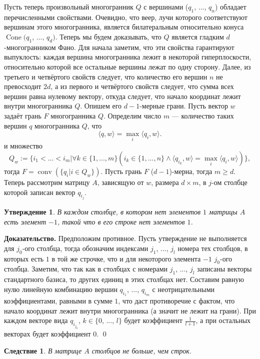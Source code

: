 \documentclass[12pt,notitlepage]{article}
\DeclareMathOperator{\conv}{conv}
\DeclareMathOperator{\Cone}{Cone}
\newtheorem{statement}{Утверждение}
\newtheorem*{corollary}{Следствие}
\begin{document}
	Пусть теперь произвольный многогранник $Q$ с вершинами ($q_1$, ..., $q_n$) обладает перечисленными свойствами. Очевидно, что веер, лучи которого соответствуют вершинам этого многогранника, является билатеральным относительно конуса $\Cone(q_1$, ..., $q_d)$. Теперь мы будем доказывать, что $Q$ является гладким $d$-многогранником Фано. Для начала заметим, что эти свойства гарантируют выпуклость: каждая вершина многогранника лежит в некоторой гиперплоскости, относительно которой все остальные вершины лежат по одну сторону. Далее, из третьего и четвёртого свойств следует, что количество его вершин $n$ не превосходит $2d$, а из первого и четвёртого свойств следует, что сумма всех вершин равна нулевому вектору, откуда следует, что начало координат лежит внутри многогранника $Q$. Опишем его $d-1$-мерные грани. Пусть вектор $w$ задаёт грань $F$ многогранника $Q$. Определим число $m$ --- количество таких вершин $q$ многогранника $Q$, что 
	\[
	\langle q, w\rangle = \max_i  \langle q_i, w\rangle.
	\]
	и множество
	\[
	Q_w := \{ i_1 < ... < i_m | \forall k \in \{1, ..., m\} (i_k \in \{1, ..., n\} \wedge \langle q_{i_k}, w\rangle = \max_i  \langle q_i, w\rangle )\},
	\]
	тогда $F=\conv(\{q_i | i \in Q_w\})$. Пусть грань $F$ ($d-1$)-мерна, тогда $m \geq d$. Теперь рассмотрим матрицу $A$, зависящую от $w$, размера $d \times m$, в $j$-ом столбце которой записан вектор $q_{i_j}$.
	
	\begin{statement}
		В каждом столбце, в котором нет элементов $1$ матрицы $A$ есть элемент $-1$, такой что в его строке нет элементов $1$.
	\end{statement}
	
	\textbf{Доказательство.} Предположим противное. Пусть утверждение не выполняется для $j_0$-ого столбца, тогда обозначим индексами $j_1$, ..., $j_l$ номера тех столбцов, в которых есть $1$ в той же строчке, что и для некоторого элемента $-1$ $j_0$-ого столбца. Заметим, что так как в столбцах с номерами $j_1$, ..., $j_l$ записаны векторы стандартного базиса, то других единиц в этих столбцах нет. Составим равную нулю линейную комбинацию вершин $q_{i_1}$, ..., $q_{i_m}$ с неотрицательными коэффициентами, равными в сумме $1$, что даст противоречие с фактом, что начало координат лежит внутри многогранника (а значит не лежит на грани). При каждом векторе вида $q_{i_{j_k}}$, $k \in \{0$, ..., $l\}$ будет коэффициент $\frac{1}{l+1}$, а при остальных векторах будет коэффициент $0$. \qed
	
	\begin{corollary}
		В матрице $A$ столбцов не больше, чем строк.
	\end{corollary}
	
\end{document}

